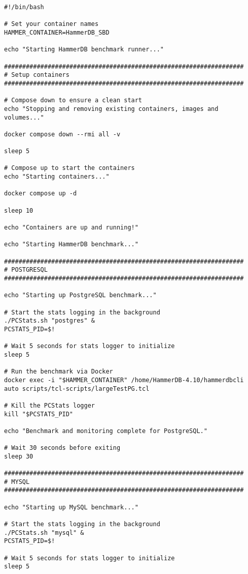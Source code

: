 \begin{lstlisting}[caption={Shell script to run the TCL scripts}, label={lst:shell-script}]
#!/bin/bash

# Set your container names
HAMMER_CONTAINER=HammerDB_SBD

echo "Starting HammerDB benchmark runner..."

##################################################################
# Setup containers
##################################################################

# Compose down to ensure a clean start
echo "Stopping and removing existing containers, images and volumes..."

docker compose down --rmi all -v

sleep 5

# Compose up to start the containers
echo "Starting containers..."

docker compose up -d

sleep 10

echo "Containers are up and running!"

echo "Starting HammerDB benchmark..."

##################################################################
# POSTGRESQL
##################################################################

echo "Starting up PostgreSQL benchmark..."

# Start the stats logging in the background
./PCStats.sh "postgres" &
PCSTATS_PID=$!

# Wait 5 seconds for stats logger to initialize
sleep 5

# Run the benchmark via Docker
docker exec -i "$HAMMER_CONTAINER" /home/HammerDB-4.10/hammerdbcli auto scripts/tcl-scripts/largeTestPG.tcl

# Kill the PCStats logger
kill "$PCSTATS_PID"

echo "Benchmark and monitoring complete for PostgreSQL."

# Wait 30 seconds before exiting
sleep 30

##################################################################
# MYSQL
##################################################################

echo "Starting up MySQL benchmark..."

# Start the stats logging in the background
./PCStats.sh "mysql" &
PCSTATS_PID=$!

# Wait 5 seconds for stats logger to initialize
sleep 5


\end{lstlisting}
